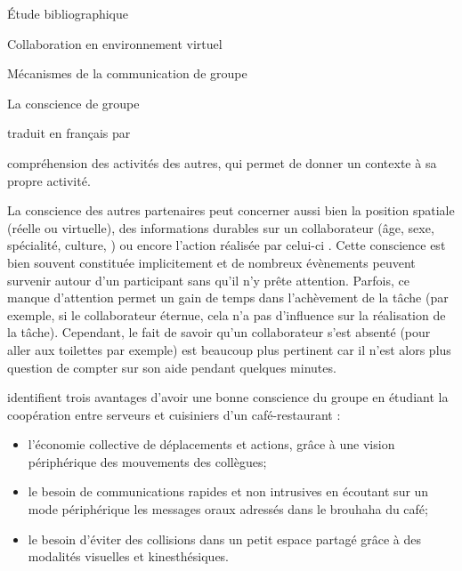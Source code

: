 \documentclass[myfrancais,ngerman,english,french]{mythesis}
\begin{document}
\begin{mychapter}{Étude bibliographique}
\begin{mysection}{Collaboration en environnement virtuel}
\begin{mysubsection}{Mécanismes de la communication de groupe}
\begin{mysubsubsection}{La conscience de groupe}
\begin{myquote}[english]
					\end{myquote}
					traduit en français par 
					\begin{myquote} compréhension des activités des autres, qui permet de donner un contexte à sa propre activité.
					\end{myquote}

					La conscience des autres partenaires peut concerner aussi bien la position spatiale (réelle ou virtuelle), des informations durables sur un collaborateur (âge, sexe, spécialité, culture, \myetc) ou encore l'action réalisée par celui-ci .
					Cette conscience est bien souvent constituée implicitement et de nombreux évènements peuvent survenir autour d'un participant sans qu'il n'y prête attention.
					Parfois, ce manque d'attention permet un gain de temps dans l'achèvement de la tâche (par exemple, si le collaborateur éternue, cela n'a pas d'influence sur la réalisation de la tâche).
					Cependant, le fait de savoir qu'un collaborateur s'est absenté (pour aller aux toilettes par exemple) est beaucoup plus pertinent car il n'est alors plus question de compter sur son aide pendant quelques minutes.

					 identifient trois avantages d'avoir une bonne conscience du groupe en étudiant la coopération entre serveurs et cuisiniers d'un café-restaurant :
					\begin{itemize}
						\item l'économie collective de déplacements et actions, grâce à une vision périphérique des mouvements des collègues;
						\item le besoin de communications rapides et non intrusives en écoutant sur un mode périphérique les messages oraux adressés dans le brouhaha du café;
						\item le besoin d'éviter des collisions dans un petit espace partagé grâce à des modalités visuelles et kinesthésiques.
					\end{itemize}


\end{mysubsubsection}
\end{mysubsection}
\end{mysection}
\end{mychapter}
\end{document}
